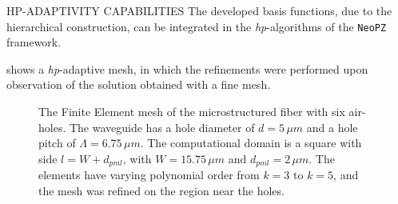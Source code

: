 \documentclass[debug]{beamer} %
\begin{document}
\begin{frame}
\begin{columns}
\begin{column}{0.45\textwidth}
{        \vfill

        \begin{block}{\boxnumber HP-ADAPTIVITY CAPABILITIES }
        The developed basis functions, due to the hierarchical construction, can be integrated in the \emph{hp}-algorithms of the \texttt{NeoPZ} framework\parencite{diazcalle15}.

         shows a \emph{hp}-adaptive mesh, in which the refinements were performed upon observation of the solution obtained with a fine mesh.
	        \begin{figure}
	        	\centering
	    	    \caption{The Finite Element mesh of the microstructured fiber with six air-holes. The waveguide has a hole diameter of $d = 5\,\mu m$ and a hole pitch of $\Lambda=6.75\,\mu m$. The computational domain is a square with side $l=W+d_{pml}$, with $W=15.75\,\mu m$ and $d_{pml} = 2\, \mu m$. The elements have varying polynomial order from $k=3$ to $k=5$, and the mesh was refined on the region near the holes.}
	    	    \label{fig:mesh-holey}
	    	\end{figure}    	



\end{block}}
\end{column}
\end{columns}
\end{frame}
\end{document}
